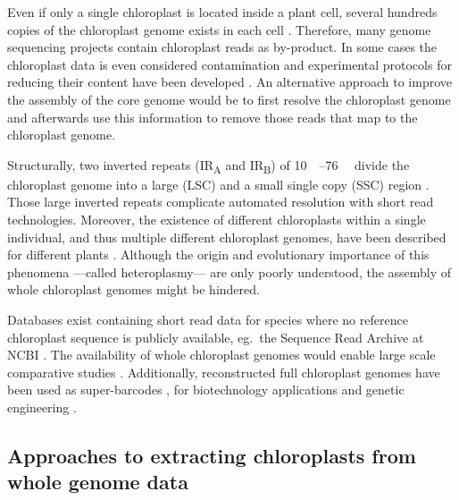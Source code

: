 \documentclass{bmcart}
\begin{document}
Even if only a single chloroplast is located inside a plant cell, several hundreds copies of the chloroplast genome exists in each cell \cite{kumar_2014,bendich_1987}.
Therefore, many genome sequencing projects contain chloroplast reads as by-product.
In some cases the chloroplast data is even considered contamination and experimental protocols for reducing their content have been developed \cite{lutz_isolation_2011}.
An alternative approach to improve the assembly of the core genome would be to first resolve the chloroplast genome and afterwards use this information to remove those reads that map to the chloroplast genome.

Structurally, two inverted repeats (IR\textsubscript{A} and IR\textsubscript{B}) of \SIrange{10}{76}{\kilo\basepair} divide the chloroplast genome into a large (LSC) and a small single copy (SSC) region \cite{palmer_1985}.
Those large inverted repeats complicate automated resolution with short read technologies\cite{Wang2018}.
Moreover, the existence of different chloroplasts within a single individual, and thus multiple different chloroplast genomes, have been described for different plants \cite{corriveau_1988,Chat2002,Scar2016}.
Although the origin and evolutionary importance of this phenomena ---called heteroplasmy--- are only poorly understood, the assembly of whole chloroplast genomes might be hindered.  

Databases exist containing short read data for species where no reference chloroplast sequence is publicly available, eg.\ the Sequence Read Archive at NCBI \cite{sra2010}.
The availability of whole chloroplast genomes would enable large scale comparative studies \cite{tonti-filippini_what_2017}.
Additionally, reconstructed full chloroplast genomes have been used as super-barcodes \cite{coissac_barcodes_2016}, for biotechnology applications and genetic engineering \cite{daniell_chloroplast_2016}.

\subsection*{Approaches to extracting chloroplasts from whole genome data}
\end{document}
